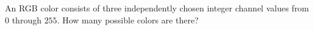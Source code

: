 An RGB color consists of three independently chosen integer channel values from $0$ through $255$. How many possible colors are there?
